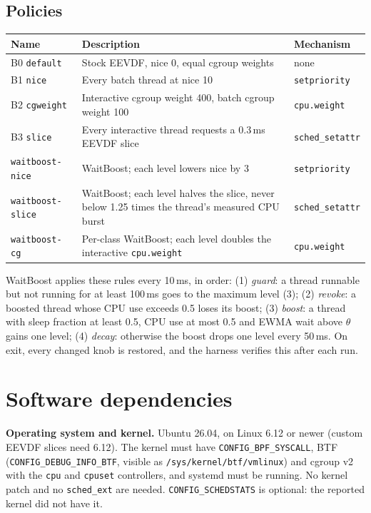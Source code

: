 \documentclass[10.5pt,a4paper]{article}
\newcommand{\f}[1]{\texttt{#1}}
\begin{document}
\subsection{Policies}
\begin{tabularx}{\textwidth}{@{}l L l@{}}
\toprule
\textbf{Name} & \textbf{Description} & \textbf{Mechanism} \\
\midrule
B0 \f{default} & Stock EEVDF, nice 0, equal cgroup weights & none \\
B1 \f{nice} & Every batch thread at nice 10 & \f{setpriority} \\
B2 \f{cgweight} & Interactive cgroup weight 400, batch cgroup weight 100 & \f{cpu.weight} \\
B3 \f{slice} & Every interactive thread requests a 0.3\,ms EEVDF slice & \f{sched\_setattr} \\
\f{waitboost-nice} & WaitBoost; each level lowers nice by 3 & \f{setpriority} \\
\f{waitboost-slice} & WaitBoost; each level halves the slice, never below 1.25 times the thread's measured CPU burst & \f{sched\_setattr} \\
\f{waitboost-cg} & Per-class WaitBoost; each level doubles the interactive \f{cpu.weight} & \f{cpu.weight} \\
\bottomrule
\end{tabularx}

WaitBoost applies these rules every 10\,ms, in order: (1) \emph{guard}: a thread runnable but not running for at least 100\,ms goes to the maximum level (3); (2) \emph{revoke}: a boosted thread whose CPU use exceeds 0.5 loses its boost; (3) \emph{boost}: a thread with sleep fraction at least 0.5, CPU use at most 0.5 and EWMA wait above $\theta$ gains one level; (4) \emph{decay}: otherwise the boost drops one level every 50\,ms. On exit, every changed knob is restored, and the harness verifies this after each run.

\section{Software dependencies}

\textbf{Operating system and kernel.} Ubuntu 26.04, on Linux 6.12 or newer (custom EEVDF slices need 6.12). The kernel must have \f{CONFIG\_BPF\_SYSCALL}, BTF (\f{CONFIG\_DEBUG\_INFO\_BTF}, visible as \f{/sys/kernel/btf/vmlinux}) and cgroup v2 with the \f{cpu} and \f{cpuset} controllers, and systemd must be running. No kernel patch and no \f{sched\_ext} are needed. \f{CONFIG\_SCHEDSTATS} is optional: the reported kernel did not have it.
\end{document}

